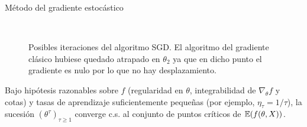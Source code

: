 \documentclass[handout, 9pt]{beamer}
\begin{document}
\begin{frame}{Método del gradiente estocástico}

\begin{figure}[H]
  \centering
  \\
  \caption{Posibles iteraciones del algoritmo SGD. El algoritmo del gradiente clásico hubiese quedado atrapado en $\theta_2$ ya que en dicho punto el gradiente es nulo por lo que no hay desplazamiento.}
\end{figure} \pause 

\begin{theorem} Bajo hipótesis razonables sobre $f$ (regularidad en $\theta$, integrabilidad de $\nabla_\theta f$ y cotas) y tasas de aprendizaje suficientemente pequeñas (por ejemplo, $\eta_\tau = 1/\tau$), la sucesión $(\theta^\tau)_{\tau\geq 1}$ converge c.s. al conjunto de puntos críticos de $\operatorname{\mathbb{E}}(f(\theta,X))$.\\   
  \end{theorem}



\end{frame}
\end{document}
